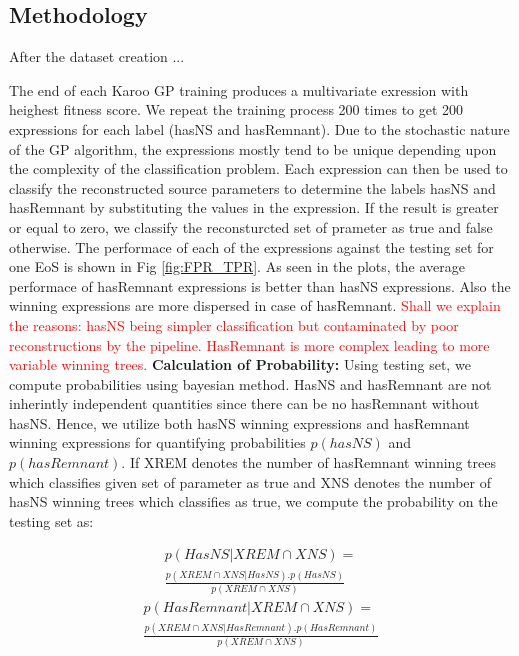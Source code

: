 \subsection{Methodology}

After the dataset creation ...

The end of each Karoo GP training produces a multivariate exression with heighest fitness score. We repeat the training process 200 times to get 200 expressions for each label (hasNS and hasRemnant). Due to the stochastic nature of the GP algorithm, the expressions mostly tend to be unique depending upon the complexity of the classification problem. Each expression can then be used to classify the reconstructed source parameters to determine the labels hasNS and hasRemnant by substituting the values in the expression. If the result is greater or equal to zero, we classify the reconsturcted set of prameter as true and false otherwise. The performace of each of the expressions against the testing set for one EoS is shown in Fig \ref{fig:FPR_TPR}. As seen in the plots, the average performace of hasRemnant expressions is better than hasNS expressions. Also the winning expressions are more dispersed in case of hasRemnant.  \textcolor{red}{Shall we explain the reasons: hasNS being simpler classification but contaminated by poor reconstructions by the pipeline. HasRemnant is more complex leading to more variable winning trees.} 
\linebreak
\textbf{Calculation of Probability:} Using testing set, we compute probabilities using bayesian method. HasNS and hasRemnant are not inherintly independent quantities since there can be no hasRemnant without hasNS. Hence, we utilize both hasNS winning expressions and hasRemnant winning expressions for quantifying probabilities $p(hasNS)$ and $p(hasRemnant)$. If XREM denotes the number of hasRemnant winning trees which classifies given set of parameter as true and XNS denotes the number of hasNS winning trees which classifies as true, we compute the probability on the testing set as:    

\begin{equation} \label{eq:1}
\begin{split}
p(HasNS| XREM \cap XNS) =\\ 
\frac{p(XREM \cap XNS|HasNS).p(HasNS)}{p(XREM \cap XNS)}
\end{split}
\end{equation}
\begin{equation} \label{eq:2}
\begin{split}
p(HasRemnant| XREM \cap XNS) =\\ 
\frac{p(XREM \cap XNS|HasRemnant).p(HasRemnant)}{p(XREM \cap XNS)}
\end{split}
\end{equation}

